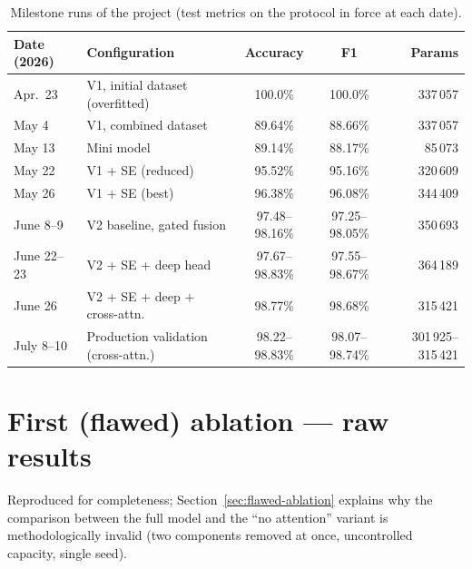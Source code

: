 \begin{table}[H]
\centering
\caption{Milestone runs of the project (test metrics on the protocol in force at each date).}
\renewcommand{\arraystretch}{1.25}
\footnotesize
\begin{tabular}{|l|l|c|c|r|}
\hline
\textbf{Date (2026)} & \textbf{Configuration} & \textbf{Accuracy} & \textbf{F1} & \textbf{Params} \\
\hline
Apr.\ 23 & V1, initial dataset (overfitted) & 100.0\% & 100.0\% & 337\,057 \\
\hline
May 4 & V1, combined dataset & 89.64\% & 88.66\% & 337\,057 \\
\hline
May 13 & Mini model & 89.14\% & 88.17\% & 85\,073 \\
\hline
May 22 & V1 + SE (reduced) & 95.52\% & 95.16\% & 320\,609 \\
\hline
May 26 & V1 + SE (best) & 96.38\% & 96.08\% & 344\,409 \\
\hline
June 8--9 & V2 baseline, gated fusion & 97.48--98.16\% & 97.25--98.05\% & 350\,693 \\
\hline
June 22--23 & V2 + SE + deep head & 97.67--98.83\% & 97.55--98.67\% & 364\,189 \\
\hline
June 26 & V2 + SE + deep + cross-attn. & 98.77\% & 98.68\% & 315\,421 \\
\hline
July 8--10 & Production validation (cross-attn.) & 98.22--98.83\% & 98.07--98.74\% & 301\,925--315\,421 \\
\hline
\end{tabular}
\end{table}

\section{First (flawed) ablation --- raw results}

Reproduced for completeness; Section~\ref{sec:flawed-ablation} explains why the comparison between the full model and the ``no attention'' variant is methodologically invalid (two components removed at once, uncontrolled capacity, single seed).

